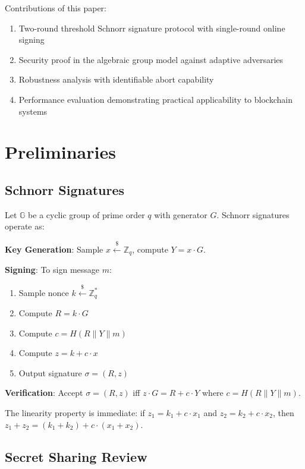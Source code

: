 \documentclass[11pt,a4paper]{article}
\begin{document}
Contributions of this paper:
\begin{enumerate}[noitemsep]
    \item Two-round threshold Schnorr signature protocol with single-round online signing
    \item Security proof in the algebraic group model against adaptive adversaries
    \item Robustness analysis with identifiable abort capability
    \item Performance evaluation demonstrating practical applicability to blockchain systems
\end{enumerate}

\section{Preliminaries}

\subsection{Schnorr Signatures}

Let $\mathbb{G}$ be a cyclic group of prime order $q$ with generator $G$. Schnorr signatures operate as:

\textbf{Key Generation}: Sample $x \xleftarrow{\$} \mathbb{Z}_q$, compute $Y = x \cdot G$.

\textbf{Signing}: To sign message $m$:
\begin{enumerate}
    \item Sample nonce $k \xleftarrow{\$} \mathbb{Z}_q^*$
    \item Compute $R = k \cdot G$
    \item Compute $c = H(R \| Y \| m)$
    \item Compute $z = k + c \cdot x$
    \item Output signature $\sigma = (R, z)$
\end{enumerate}

\textbf{Verification}: Accept $\sigma = (R, z)$ iff $z \cdot G = R + c \cdot Y$ where $c = H(R \| Y \| m)$.

The linearity property is immediate: if $z_1 = k_1 + c \cdot x_1$ and $z_2 = k_2 + c \cdot x_2$, then $z_1 + z_2 = (k_1 + k_2) + c \cdot (x_1 + x_2)$.

\subsection{Secret Sharing Review}
\end{document}
